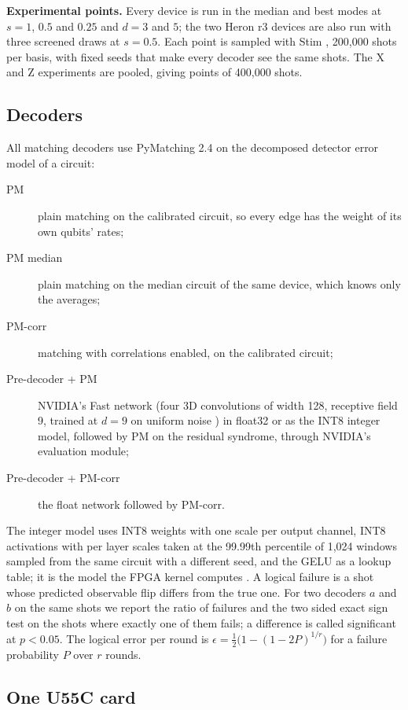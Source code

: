 \textbf{Experimental points.} Every device is run in the median and best modes at $s = 1$, $0.5$ and $0.25$ and
$d = 3$ and $5$; the two Heron r3 devices are also run with three screened draws at $s = 0.5$. Each point is sampled
with Stim \cite{gidney2021stim}, 200,000 shots per basis, with fixed seeds that make every decoder see the same shots.
The X and Z experiments are pooled, giving \NumPoints{} points of 400,000 shots.

\subsection{Decoders}\label{sec:decoders}

All matching decoders use PyMatching 2.4 \cite{higgott2022pymatching,higgott2025sparse} on the decomposed detector
error model of a circuit:
\begin{description}
\item[PM] plain matching on the calibrated circuit, so every edge has the weight of its own qubits' rates;
\item[PM median] plain matching on the median circuit of the same device, which knows only the averages;
\item[PM-corr] matching with correlations enabled, on the calibrated circuit;
\item[Pre-decoder + PM] NVIDIA's Fast network (four 3D convolutions of width 128, receptive field 9, trained at
$d = 9$ on uniform noise \cite{nvidia_fast_card}) in float32 or as the INT8 integer model, followed by PM on the
residual syndrome, through NVIDIA's evaluation module;
\item[Pre-decoder + PM-corr] the float network followed by PM-corr.
\end{description}
The integer model uses INT8 weights with one scale per output channel, INT8 activations with per layer scales taken
at the 99.99th percentile of 1,024 windows sampled from the same circuit with a different seed, and the GELU as a
lookup table; it is the model the FPGA kernel computes
\cite{ali2026nodes}. A logical failure is a shot whose predicted observable flip differs from the true one. For two
decoders $a$ and $b$ on the same shots we report the ratio of failures and the two sided exact sign test on the shots
where exactly one of them fails; a difference is called significant at $p < 0.05$. The logical error per round is
$\epsilon = \tfrac12\bigl(1 - (1 - 2P)^{1/r}\bigr)$ for a failure probability $P$ over $r$ rounds.

\subsection{One U55C card}\label{sec:card}

